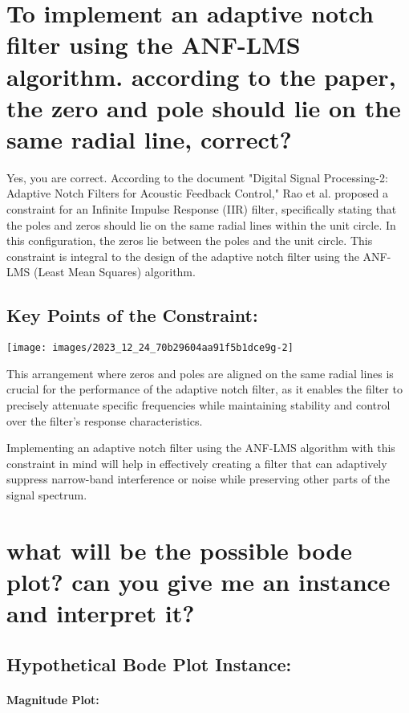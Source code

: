 \section{To implement an adaptive notch filter using the ANF-LMS algorithm. according to the paper, the zero and pole should lie on the same radial line, correct?}

Yes, you are correct. According to the document "Digital Signal Processing-2: Adaptive Notch Filters for Acoustic Feedback Control," Rao et al. proposed a constraint for an Infinite Impulse Response (IIR) filter, specifically stating that the poles and zeros should lie on the same radial lines within the unit circle. In this configuration, the zeros lie between the poles and the unit circle. This constraint is integral to the design of the adaptive notch filter using the ANF-LMS (Least Mean Squares) algorithm.

\subsection{Key Points of the Constraint:}

\begin{center}
\texttt{[image: images/2023\_12\_24\_70b29604aa91f5b1dce9g-2]}
\end{center}

This arrangement where zeros and poles are aligned on the same radial lines is crucial for the performance of the adaptive notch filter, as it enables the filter to precisely attenuate specific frequencies while maintaining stability and control over the filter's response characteristics.

Implementing an adaptive notch filter using the ANF-LMS algorithm with this constraint in mind will help in effectively creating a filter that can adaptively suppress narrow-band interference or noise while preserving other parts of the signal spectrum.

\section{what will be the possible bode plot? can you give me an instance and interpret it?}

\subsection{Hypothetical Bode Plot Instance:}

\paragraph{Magnitude Plot:}

